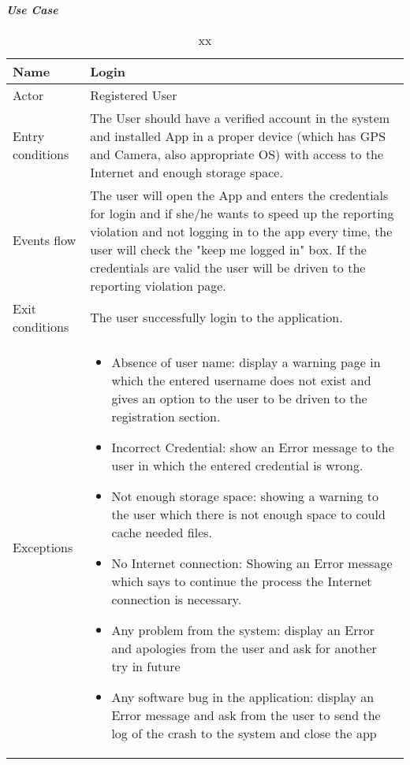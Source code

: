 \emph{\textbf{Use Case}}

\begin{table}[!hbtp]
\footnotesize
\centering
\settowidth{}
\setlength\extrarowheight{2pt}
\begin{tabulary}{\textwidth}{|J|J|}
\hline
Name             & Login \\
\hline
Actor            & Registered User \\
\hline
Entry conditions & The User should have a verified account in the system and installed App in a proper device (which has GPS and Camera, also appropriate OS) with access to the Internet and enough storage space.\\
\hline 
Events flow      & The user will open the App and enters the credentials for login and if she/he wants to speed up the reporting violation and not logging in to the app every time, the user will check the "keep me logged in" box. If the credentials are valid the user will be driven to the reporting violation page.\\
\hline 
Exit conditions  & The user successfully login to the application.\\
\hline 
Exceptions       & 
\begin{minipage}[t]{0.8\textwidth}
\begin{itemize} 
\item Absence of user name: display a warning page in which the entered username does not exist and gives an option to the user to be driven to the registration section.
\item Incorrect Credential: show an Error message to the user in which the entered credential is wrong.
\item Not enough storage space: showing a warning to the user which there is not enough space to could cache needed files.
\item No Internet connection: Showing an Error message which says to continue the process the Internet connection is necessary.
\item Any problem from the system: display an Error and apologies from the user and ask for another try in future
\item Any software bug in the application: display an Error message and ask from the user to send the log of the crash to the system and close the app
\end{itemize}
\end{minipage}\\
\hline
\end{tabulary}
\caption{\label{tab:xx}xx}
\end{table}

